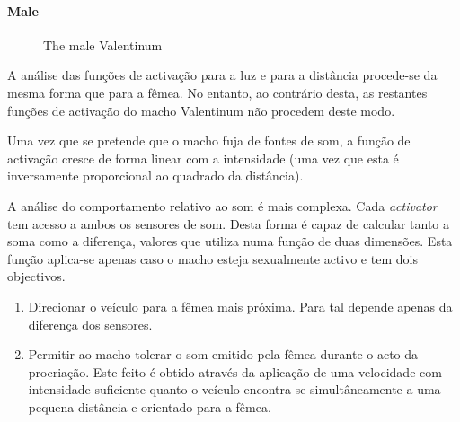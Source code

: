 \documentclass[a4paper]{article}
\begin{document}
\paragraph{Male}
\begin{figure}[ht]
	\centering
	\caption{The male Valentinum}
\end{figure}

\indent A análise das funções de activação para a luz e para a distância procede-se da mesma forma que para a fêmea.
No entanto, ao contrário desta, as restantes funções de activação do macho Valentinum não procedem deste modo.

\indent Uma vez que se pretende que o macho fuja de fontes de som, a função de activação cresce de forma linear com a
intensidade (uma vez que esta é inversamente proporcional ao quadrado da distância).

\indent A análise do comportamento relativo ao som é mais complexa. Cada \emph{activator} tem acesso a ambos os sensores de 
som. Desta forma é capaz de calcular tanto a soma como a diferença, valores que utiliza numa função de duas dimensões.
Esta função aplica-se apenas caso o macho esteja sexualmente activo e tem dois objectivos.
\begin{enumerate}
\item
Direcionar o veículo para a fêmea mais próxima. Para tal depende apenas da diferença dos sensores.
\item
Permitir ao macho tolerar o som emitido pela fêmea durante o acto da procriação.
Este feito é obtido através da aplicação de uma velocidade com intensidade suficiente quanto o veículo encontra-se simultâneamente a uma pequena distância e orientado para a fêmea.
\end{enumerate}
\end{document}
